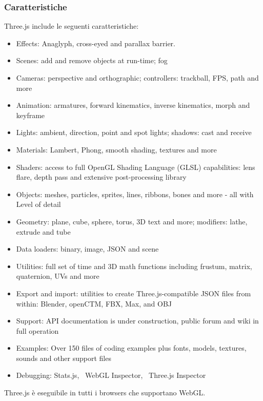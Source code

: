 
\subsubsection{Caratteristiche}
Three.js include le seguenti caratteristiche:~\cite{mrdoob}
\begin{itemize}

\item Effects: Anaglyph, cross-eyed and parallax barrier.
\item Scenes: add and remove objects at run-time; fog
\item Cameras: perspective and orthographic; controllers: trackball, FPS, path and more
\item Animation: armatures, forward kinematics, inverse kinematics, morph and keyframe
\item Lights: ambient, direction, point and spot lights; shadows: cast and receive
\item Materials: Lambert, Phong, smooth shading, textures and more
\item Shaders: access to full OpenGL Shading Language (GLSL) capabilities: lens flare, depth pass and extensive post-processing library
\item Objects: meshes, particles, sprites, lines, ribbons, bones and more - all with Level of detail
\item Geometry: plane, cube, sphere, torus, 3D text and more; modifiers: lathe, extrude and tube
\item Data loaders: binary, image, JSON and scene
\item Utilities: full set of time and 3D math functions including frustum, matrix, quaternion, UVs and more
\item Export and import: utilities to create Three.js-compatible JSON files from within: Blender, openCTM, FBX, Max, and OBJ
\item Support: API documentation is under construction, public forum and wiki in full operation
\item Examples: Over 150 files of coding examples plus fonts, models, textures, sounds and other support files
\item Debugging: Stats.js,~\cite{stats.js} WebGL Inspector,~\cite{webglinspector} Three.js Inspector~\cite{threejsinspector}
\end{itemize}

Three.js è eseguibile in tutti i browsers che supportano WebGL.

